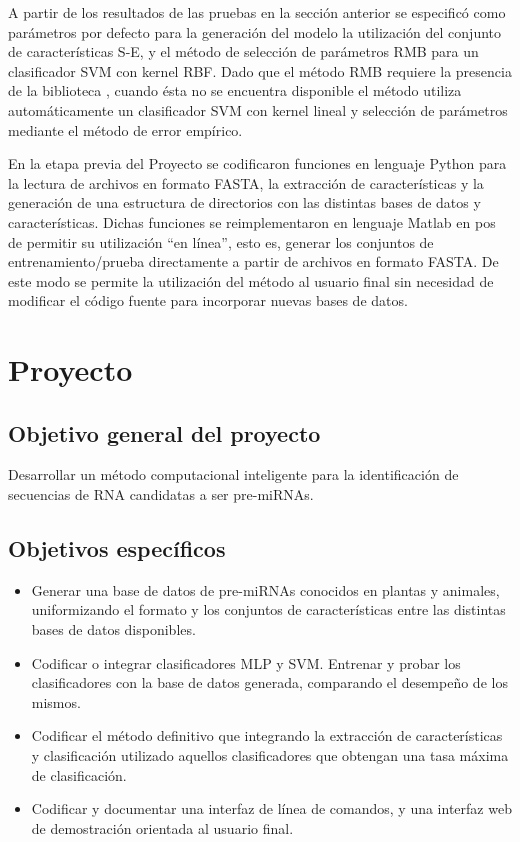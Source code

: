 \documentclass[12pt,bibliography=oldstyle,DIV=12,parskip=half-]{scrreprt}
\begin{document}
A partir de los resultados de las pruebas en la sección anterior se
especificó como parámetros por defecto para la generación del modelo
la utilización del conjunto de características S-E, y el método de
selección de parámetros RMB para un clasificador SVM con kernel RBF.
Dado que el método RMB requiere la presencia de la biblioteca
, cuando ésta no se encuentra disponible el método utiliza
automáticamente un clasificador SVM con kernel lineal y selección de
parámetros mediante el método de error empírico.

En la etapa previa del Proyecto se codificaron funciones en lenguaje
Python para la lectura de archivos en formato FASTA, la extracción de
características y la generación de una estructura de directorios con
las distintas bases de datos y características.  Dichas funciones se
reimplementaron en lenguaje Matlab en pos de permitir su utilización
``en línea'', esto es, generar los conjuntos de entrenamiento/prueba
directamente a partir de archivos en formato FASTA. De este modo se
permite la utilización del método al usuario final sin necesidad de
modificar el código fuente para incorporar nuevas bases de datos.
%
%

\chapter{Proyecto}

\section{Objetivo general del proyecto}
Desarrollar un método computacional inteligente para la identificación
de secuencias de RNA candidatas a ser pre-miRNAs.
\section{Objetivos específicos}
\begin{itemize}
\item Generar una base de datos de pre-miRNAs conocidos en plantas y
  animales, uniformizando el formato y los conjuntos de
  características entre las distintas bases de datos disponibles.
\item Codificar o integrar clasificadores MLP y SVM. Entrenar y probar
  los clasificadores con la base de datos generada, comparando el
  desempeño de los mismos.
\item Codificar el método definitivo que integrando la extracción de
  características y clasificación utilizado aquellos clasificadores
  que obtengan una tasa máxima de clasificación.
\item Codificar y documentar una interfaz de línea de comandos, y una
  interfaz web de demostración orientada al usuario final.
\end{itemize}
%
%
\end{document}
